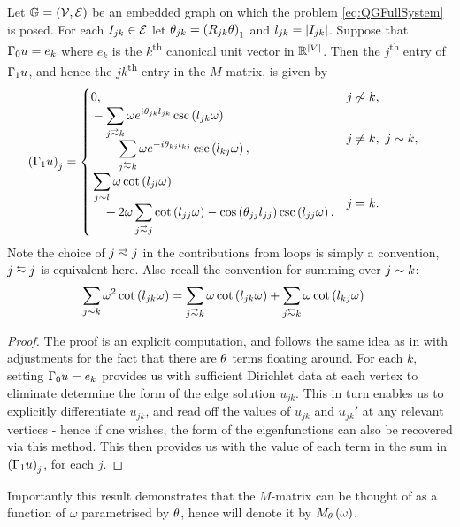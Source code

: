 \begin{prop} \label{prop:M-MatrixEntries}
	Let $\mathbb{G}=\left( \mathcal{V},\mathcal{E} \right)$ be an embedded graph on which the problem \eqref{eq:QGFullSystem} is posed.
	For each $I_{jk}\in \mathcal{E}$ let $\theta_{jk} = \left( R_{jk}\theta \right)_1$ and $l_{jk} = \left\lvert I_{jk} \right\rvert$.
	Suppose that $\Gamma_0 u = e_k$ where $e_k$ is the $k$\textsuperscript{th} canonical unit vector in $\mathbb{R}^{\left\lvert V \right\rvert}$.
	Then the $j$\textsuperscript{th} entry of $\Gamma_1 u$, and hence the $jk$\textsuperscript{th} entry in the $M$-matrix, is given by
	\begin{align*}
		\bracs{\nmap u}_j &= 
		\begin{cases}
			\!\begin{aligned}
				&0,
			\end{aligned}			
			& j \not\con k, \\
			\!\begin{aligned}
				&-\sum_{j\conLeft k} \omega e^{i\qm_{jk}l_{jk}} \csc\bracs{l_{jk}\omega} 
				\\ &\quad - \sum_{j\conRight k} \omega e^{-i\qm_{kj}l_{kj}} \csc\bracs{l_{kj}\omega},
			\end{aligned}
			& j\neq k, \ j\con k, \\
			\!\begin{aligned}
				&\sum_{j\con l} \omega\cot\bracs{l_{jl}\omega}
				\\ &\quad + 2\omega\sum_{j\conLeft j} \cot\bracs{l_{jj}\omega} - \cos\bracs{\qm_{jj}l_{jj}}\csc\bracs{l_{jj}\omega},
			\end{aligned}
			& j=k.
		\end{cases}
	\end{align*}
	Note the choice of $j\conLeft j$ in the contributions from loops is simply a convention, $j\conRight j$ is equivalent here.
	Also recall the convention for summing over $j\sim k$:
	\begin{align*}
		\sum_{j\con k} \omega^2\cot\bracs{l_{jk}\omega} &= \sum_{j\conLeft k} \omega\cot\bracs{l_{jk}\omega}	+ \sum_{j\conRight k} \omega\cot\bracs{l_{kj}\omega}
	\end{align*}
\end{prop}
\begin{proof}
	The proof is an explicit computation, and follows the same idea as in \cite{ershova2014isospectrality} with adjustments for the fact that there are $\theta$ terms floating around.
	For each $k$, setting $\Gamma_0 u = e_k$ provides us with sufficient Dirichlet data at each vertex to eliminate determine the form of the edge solution $u_{jk}$.
	This in turn enables us to explicitly differentiate $u_{jk}$, and read off the values of $u_{jk}$ and $u_{jk}'$ at any relevant vertices - hence if one wishes, the form of the eigenfunctions can also be recovered via this method.
	This then provides us with the value of each term in the sum in $\left( \Gamma_1 u \right)_j$, for each $j$.
\end{proof}
Importantly this result demonstrates that the $M$-matrix can be thought of as a function of $\omega$ parametrised by $\theta$, hence will denote it by $M_{\theta}\left( \omega \right)$.